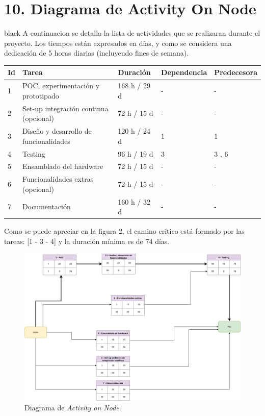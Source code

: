 \documentclass[
11pt, %
codirector, %
]{charter}
\begin{document}
\section{10. Diagrama de Activity On Node}
\label{sec:AoN}

\begin{consigna}{black}
A continuacion se detalla la lista de actividades que se realizaran durante el proyecto. Los tiempos están expresados en días, y como se considera una dedicación de 5 horas diarias (incluyendo fines de semana). 

\begin{table}[ht]
\begin{tabularx}{\linewidth}{@{}|l|X|l|l|l|@{}}
\hline
\rowcolor[HTML]{C0C0C0} 
Id	& Tarea           										& Duración 				 	& Dependencia	& Predecesora 	\\ \hline

1	& POC, experimentación y prototipado					& 168 h / 29 d				& -				&  -      		\\ \hline
2	& Set-up integración continua (opcional)				& 72 h / 15 d   			& -        		&  -			\\ \hline
3	& Diseño y desarrollo de funcionalidades    			& 120 h / 24 d				& 1			 	& 1				\\ \hline
4	& Testing								    			& 96 h / 19 d				& 3				& 3 , 6			\\ \hline
5	& Ensamblado del hardware				    			& 72 h / 15 d				& -				& -				\\ \hline
6	& Funcionalidades extras (opcional)						& 72 h / 15 d				& -				& - 			\\ \hline
7	& Documentación    										& 160 h / 32 d				& -			 	& -				\\ \hline

\end{tabularx}
\end{table}


Como se puede apreciar en la figura 2, el camino crítico está formado por las tareas: [1 - 3 - 4] y la duración mínima es de 74 días.


\begin{figure}[htpb]
\centering 
\includegraphics[width=.9\textwidth]{./Figuras/ProyectoFinal-Page-8.jpg}
\caption{Diagrama de \textit{Activity on Node}.}
\label{fig:diagBloques}
\end{figure}
\end{consigna}
\end{document}
